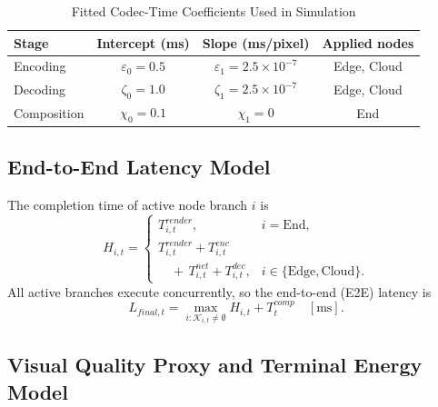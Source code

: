 \documentclass[10pt,journal,compsoc]{IEEEtran}
\begin{document}
\begin{table}[t]
	\centering
	\caption{Fitted Codec-Time Coefficients Used in Simulation}
	\label{tab:codec_coefficients}
	\footnotesize
	\setlength{\tabcolsep}{4.5pt}
	\renewcommand{\arraystretch}{1.05}
	\begin{tabular*}{\columnwidth}{@{\extracolsep{\fill}}lccc@{}}
		\toprule
		\textbf{Stage} & \textbf{Intercept (ms)} &
		\textbf{Slope (ms/pixel)} & \textbf{Applied nodes} \\
		\midrule
		Encoding & $\varepsilon_0=0.5$ & $\varepsilon_1=2.5\times10^{-7}$ & Edge, Cloud \\
		Decoding & $\zeta_0=1.0$ & $\zeta_1=2.5\times10^{-7}$ & Edge, Cloud \\
		Composition & $\chi_0=0.1$ & $\chi_1=0$ & End \\
		\bottomrule
	\end{tabular*}
\end{table}

\subsection{End-to-End Latency Model}

The completion time of active node branch $i$ is
\begin{equation}
	H_{i,t}=
	\begin{cases}
		T^{render}_{i,t}, & i=\mathrm{End},\\
		T^{render}_{i,t}+T^{enc}_{i,t}\\
		\quad +\,T^{net}_{i,t}+T^{dec}_{i,t},
		& i\in\{\mathrm{Edge},\mathrm{Cloud}\}.
	\end{cases}
	\label{eq:branch_latency}
\end{equation}
All active branches execute concurrently, so the end-to-end (E2E) latency is
\begin{equation}
	L_{final,t}=\max_{i:\mathcal{K}_{i,t}\neq\emptyset}H_{i,t}+T^{comp}_{t}
	\quad [\mathrm{ms}].
	\label{eq:e2e_latency}
\end{equation}

\subsection{Visual Quality Proxy and Terminal Energy Model}
\label{sec:quality_energy}
\end{document}
